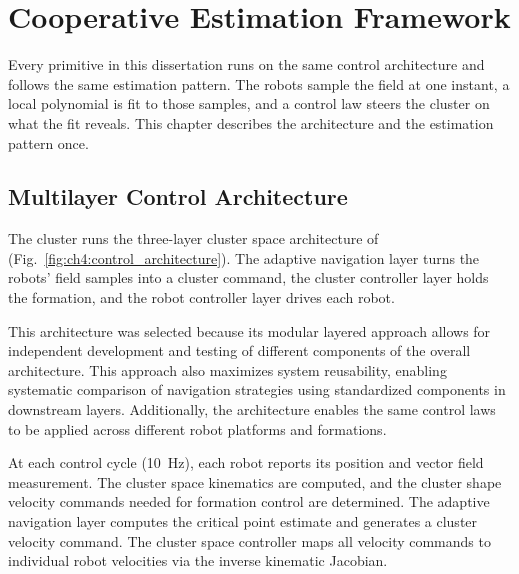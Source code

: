 \chapter{Cooperative Estimation Framework}
\label{ch:estimation}

Every primitive in this dissertation runs on the same control
architecture and follows the same estimation pattern. The robots sample
the field at one instant, a local polynomial is fit to those samples, and
a control law steers the cluster on what the fit reveals. This chapter
describes the architecture and the estimation pattern once.

\section{Multilayer Control Architecture}
\label{sec:ch4:architecture}

The cluster runs the three-layer cluster space architecture of
\cite{2} (Fig.~\ref{fig:ch4:control_architecture}). The adaptive
navigation layer turns the robots' field samples into a cluster command,
the cluster controller layer holds the formation, and the robot controller
layer drives each robot.

This architecture was selected because its modular layered approach
allows for independent development and testing of different components
of the overall architecture. This approach also maximizes system
reusability, enabling systematic comparison of navigation strategies
using standardized components in downstream layers. Additionally, the
architecture enables the same control laws to be applied across different
robot platforms and formations.

At each control cycle (10~Hz), each robot reports its position and vector field measurement. The cluster space kinematics are computed, and the cluster shape velocity commands needed for formation control are determined. The adaptive navigation layer computes the critical point estimate and generates a cluster velocity command. The cluster space controller maps all velocity commands to individual robot velocities via the inverse kinematic Jacobian.

